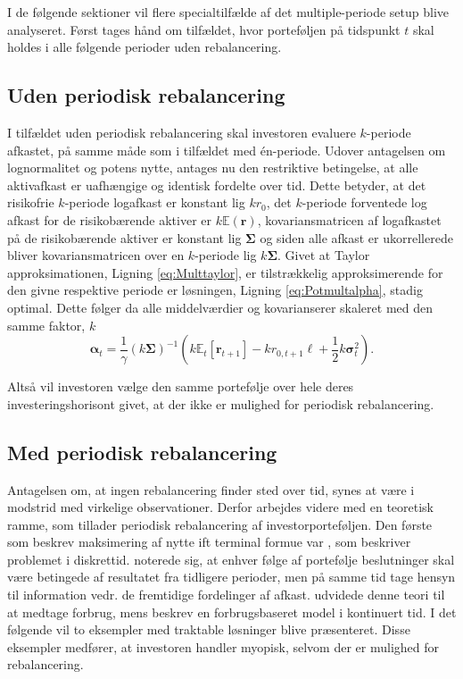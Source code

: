 \documentclass[
  a4paper,
  oneside]{memoir}
\begin{document}
I de følgende sektioner vil flere specialtilfælde af det multiple-periode setup blive analyseret. Først tages hånd om tilfældet, hvor porteføljen på tidspunkt \(t\) skal holdes i alle følgende perioder uden rebalancering.

\hypertarget{uden-periodisk-rebalancering}{%
\subsection{Uden periodisk rebalancering}\label{uden-periodisk-rebalancering}}

I tilfældet uden periodisk rebalancering skal investoren evaluere \(k\)-periode afkastet, på samme måde som i tilfældet med én-periode. Udover antagelsen om lognormalitet og potens nytte, antages nu den restriktive betingelse, at alle aktivafkast er uafhængige og identisk fordelte over tid. Dette betyder, at det risikofrie \(k\)-periode logafkast er konstant lig \(kr_{0}\), det \(k\)-periode forventede log afkast for de risikobærende aktiver er \(k\mathbb{E}(\bm{r})\), kovariansmatricen af logafkastet på de risikobærende aktiver er konstant lig \(\bm{\Sigma}\) og siden alle afkast er ukorrellerede bliver kovariansmatricen over en \(k\)-periode lig \(k\bm{\Sigma}\). Givet at Taylor approksimationen, Ligning \eqref{eq:Multtaylor}, er tilstrækkelig approksimerende for den givne respektive periode er løsningen, Ligning \eqref{eq:Potmultalpha}, stadig optimal. Dette følger da alle middelværdier og kovarianserer skaleret med den samme faktor, \(k\)
\begin{equation}
\bm{\alpha}_t=\frac{1}{\gamma}(k\bm{\Sigma})^{-1}\left(k\mathbb{E}_t[\bm{r}_{t+1}]-kr_{0,t+1}\bm{\ell}+\frac{1}{2}k\bm{\sigma}_t^2\right). \label{eq:Potmultalphak}
\end{equation}

Altså vil investoren vælge den samme portefølje over hele deres investeringshorisont givet, at der ikke er mulighed for periodisk rebalancering.

\hypertarget{medperireb}{%
\subsection{Med periodisk rebalancering}\label{medperireb}}

Antagelsen om, at ingen rebalancering finder sted over tid, synes at være i modstrid med virkelige observationer. Derfor arbejdes videre med en teoretisk ramme, som tillader periodisk rebalancering af investorporteføljen. Den første som beskrev maksimering af nytte ift terminal formue var \citep{Mossin1968}, som beskriver problemet i diskrettid. \citep{Mossin1968} noterede sig, at enhver følge af portefølje beslutninger skal være betingede af resultatet fra tidligere perioder, men på samme tid tage hensyn til information vedr. de fremtidige fordelinger af afkast. \citep{Samuelson1969} udvidede denne teori til at medtage forbrug, mens \citep{Merton1969, Merton1971} beskrev en forbrugsbaseret model i kontinuert tid. I det følgende vil to eksempler med traktable løsninger blive præsenteret. Disse eksempler medfører, at investoren handler myopisk, selvom der er mulighed for rebalancering.
\end{document}
